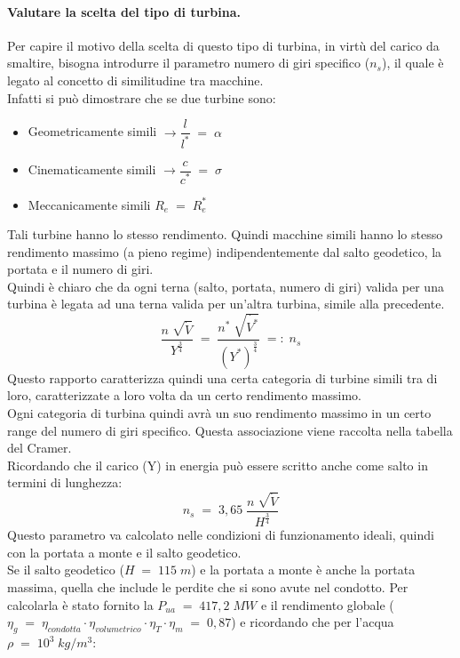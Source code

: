 \documentclass[a4paper, twoside, 12pt]{report}
\begin{document}
\paragraph{Valutare la scelta del tipo di turbina.\\}
Per capire il motivo della scelta di questo tipo di turbina, in virtù del carico da smaltire, bisogna introdurre il parametro numero di giri specifico ($n_{s}$), il quale è legato al concetto di similitudine tra macchine.\\
Infatti si può dimostrare che se due turbine sono:
\begin{itemize}
	\item Geometricamente simili $\to \dfrac{l}{l^{*}}\;=\;\alpha$
	\item Cinematicamente simili $\to \dfrac{c}{c^{*}}\;=\;\sigma$
	\item Meccanicamente simili $R_{e}\;=\;R_{e}^{*}$
\end{itemize}
Tali turbine hanno lo stesso rendimento. Quindi macchine simili hanno lo stesso rendimento massimo (a pieno regime) indipendentemente dal salto geodetico, la portata e il numero di giri.\\
Quindi è chiaro che da ogni terna (salto, portata, numero di giri) valida per una turbina è legata ad una terna valida per un'altra turbina, simile alla precedente.
\begin{equation}
	\dfrac{n\;\sqrt{\dot{V}}}{Y^{\frac{3}{4}}}\;=\;\dfrac{n^{*}\;\sqrt{\dot{V^{*}}}}{(Y^{*})^{\frac{3}{4}}}\;=:\;n_{s}
\end{equation}
Questo rapporto caratterizza quindi una certa categoria di turbine simili tra di loro, caratterizzate a loro volta da un certo rendimento massimo.\\
Ogni categoria di turbina quindi avrà un suo rendimento massimo in un certo range del numero di giri specifico. Questa associazione viene raccolta nella tabella del Cramer.\\
Ricordando che il carico (Y) in energia può essere scritto anche come salto in termini di lunghezza:
\begin{equation}
	n_{s}\;=\;3,65\;\dfrac{n\;\sqrt{\dot{V}}}{H^{\frac{3}{4}}}
\end{equation}
Questo parametro va calcolato nelle condizioni di funzionamento ideali, quindi con la portata a monte e il salto geodetico.\\
Se il salto geodetico ($H\;=\;115\;m$) e la portata a monte è anche la portata massima, quella che include le perdite che si sono avute nel condotto. Per calcolarla è stato fornito la $P_{ua}\;=\;417,2\;MW$ e il rendimento globale ($\eta_{g}\;=\;\eta_{condotta}\cdot\eta_{volumetrico}\cdot\eta_{T}\cdot\eta_{m}\;=\;0,87$) e ricordando che per l'acqua $\rho\;=\;10^{3}\;kg/m^{3}$:
\end{document}
